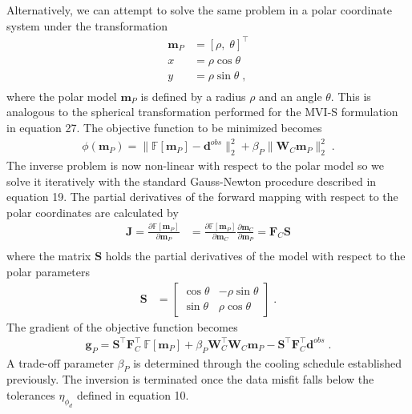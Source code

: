 \documentclass[paper]{geophysics}
\begin{document}
Alternatively, we can attempt to solve the same problem in a polar coordinate system under the transformation
\begin{equation}
\begin{split}
	\mathbf{m}_P &= [\rho,\;\theta]^\top\\
	x &= \rho \cos{\theta} \\
	y &= \rho \sin{\theta} \;,\\
\end{split}
\end{equation}
where the polar model $\mathbf{m}_P$ is defined by a radius $\rho$ and an angle $\theta$. This is analogous to the spherical transformation performed for the MVI-S formulation in equation 27.
The objective function to be minimized becomes
\begin{equation}\label{toyPolar}
\begin{split}
\phi(\mathbf{m}_P)= \| \mathbb{F}[\mathbf{m}_P] - \mathbf{d}^{obs} \|_2^2 + \beta_P \| \mathbf{W}_C \mathbf{m}_P \|_2^2 \;.
\end{split}
\end{equation}
The inverse problem is now non-linear with respect to the polar model so we solve it iteratively with the standard Gauss-Newton procedure described in equation 19.
The partial derivatives of the forward mapping with respect to the polar coordinates are calculated by
\begin{equation}\label{Jpolar}
\begin{split}
\mathbf{J} = \frac{\partial \mathbb{F}[\mathbf{m}_P]}{\partial \mathbf{m}_P} &= \frac{\partial \mathbb{F}[\mathbf{m}_P]}{\partial \mathbf{m}_C} \frac{\partial \mathbf{m}_C}{\partial \mathbf{m}_P} = \mathbf{F}_C\mathbf{S} \\
\end{split}
\end{equation}
where the matrix $\mathbf{S}$ holds the partial derivatives of the model with respect to the polar parameters
\begin{equation}\label{nonlinF}\begin{split}
\mathbf{S} &=
\begin{bmatrix}
\cos{\theta} & -\rho\sin{\theta} \\
\sin{\theta} & \rho\cos{\theta}
\end{bmatrix} \;.
\end{split}
\end{equation}
The gradient of the objective function becomes
\begin{equation}\label{gradPolar}
\begin{split}
\mathbf{g}_P = \mathbf{S}^\top \mathbf{F}_C^\top \:\mathbb{F}[\mathbf{m}_P] + \beta_P \mathbf{W}_C^\top\mathbf{W}_C \mathbf{m}_P - \mathbf{S}^\top \mathbf{F}_C^\top \mathbf{d}^{obs} \;.
\end{split}
\end{equation}
A trade-off parameter $\beta_P$ is determined through the cooling schedule established previously. The inversion is terminated once the data misfit falls below the tolerances $\eta_{\phi_d}$ defined in equation 10.
\end{document}
